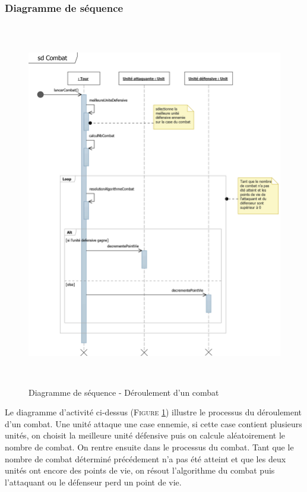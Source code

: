 \documentclass[a4paper,11pt]{article}
\begin{document}
		\subsubsection{Diagramme de séquence}
			\begin{figure}[ht!]
				\includegraphics[height=16cm]{Diagrammes/Combat/seqCombat.png}
				\caption{Diagramme de séquence - Déroulement d'un combat}
				\label{fig:seqcombat}
			\end{figure}
			\vspace*{1cm}
			Le diagramme d'activité ci-dessus (\textsc{Figure \ref{fig:seqcombat}}) illustre le processus du déroulement d'un combat. Une unité attaque une case ennemie, si cette case contient plusieurs unités, on choisit la meilleure unité défensive puis on calcule aléatoirement le nombre de combat. On rentre ensuite dans le processus du combat. Tant que le nombre de combat déterminé précédement n'a pas été atteint et que les deux unités ont encore des points de vie, on résout l'algorithme du combat puis l'attaquant ou le défenseur perd un point de vie.
\end{document}
